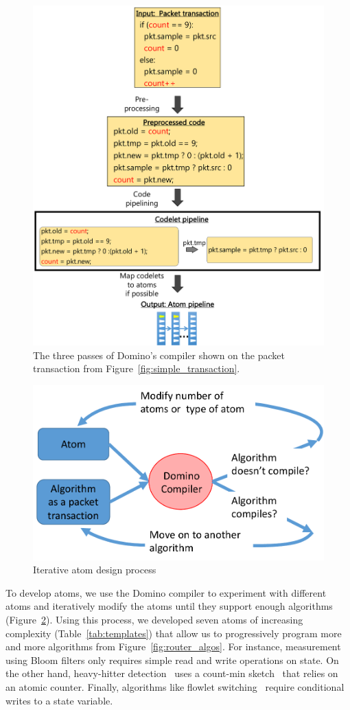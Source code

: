 \begin{figure}[!t]
\includegraphics[width=\textwidth]{compiler_passes_example.pdf}
\caption{The three passes of Domino's compiler shown on the packet transaction
from Figure~\ref{fig:simple_transaction}.}
\label{fig:compiler_passes_example}
\end{figure}

\begin{figure}
\centering
\includegraphics[width=0.5\columnwidth]{iterative_design_process.pdf}
\caption{Iterative atom design process}
\label{fig:iterative_design}
\end{figure}

To develop atoms, we use the Domino compiler to experiment with different atoms
and iteratively modify the atoms until they support enough algorithms
(Figure~\ref{fig:iterative_design}).  Using this process, we developed seven
atoms of increasing complexity (Table~\ref{tab:templates}) that allow us to
progressively program more and more algorithms from
Figure~\ref{fig:router_algos}. For instance, measurement using Bloom filters
only requires simple read and write operations on state. On the other hand,
heavy-hitter detection~\cite{opensketch} uses a count-min sketch~\cite{cormode}
that relies on an atomic counter. Finally, algorithms like flowlet
switching~\cite{flowlets} require conditional writes to a state variable.

